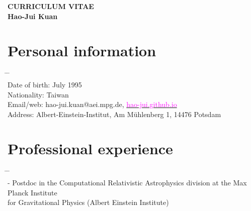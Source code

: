 \documentclass[10pt,floatfix,a4paper]{article}
\begin{document}
\begin{center}
  {\LARGE \bf CURRICULUM VITAE} \\[2ex]
  {\Large \bf Hao-Jui Kuan}
\end{center}


\section*{Personal information}
\begin{tabbing}
  \hspace*{5mm} \= \hspace*{2.3cm} \= \hspace*{10cm} \\[-3ex]
  \> Date of birth\hspace{1.2mm}:   July 1995\\
  \> Nationality\hspace{4mm}: \> Taiwan\\
  \> Email/web\hspace{4.3mm}: \> hao-jui.kuan@aei.mpg.de, \href{https://hao-jui.github.io}{\textcolor{magenta}{hao-jui.github.io}}\\
  \> Address\hspace{8.7mm}: \> Albert-Einstein-Institut, Am M{\"u}hlenberg 1, 14476 Potsdam
\end{tabbing}


\section*{Professional experience}
\begin{tabbing}
  \hspace*{5mm} \= \hspace*{2.3cm} \= \hspace*{10cm} \\[-3ex]
   - \> Postdoc in the Computational Relativistic Astrophysics division at the Max Planck Institute \\
  \> \> for Gravitational Physics (Albert Einstein Institute)
\end{tabbing}
\end{document}
